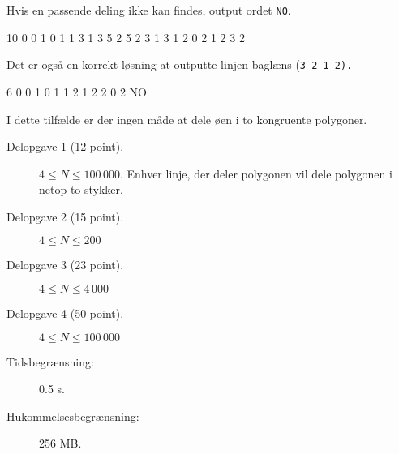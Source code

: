 \documentclass{boi2014-dk}
\newcommand{\constant}[1]{{\tt #1}}
\begin{document}
    Hvis en passende deling ikke kan findes, output ordet \constant{NO}.

    \Examples
	\example
	{
		10
		0 0
		1 0
		1 1
		3 1
		3 5
		2 5
		2 3
		1 3
		1 2
		0 2
	}
	{
		1 2 3 2
	}
	{
        Det er også en korrekt løsning at outputte linjen baglæns (\tt{3 2 1
        2}).

        \begin{center}
        \end{center}
	}

	\example
	{
		6
		0 0
		1 0
		1 1
		2 1
		2 2
		0 2
	}
	{
		NO
	}
    {
        I dette tilfælde er der ingen måde at dele øen i to kongruente
        polygoner.
        \begin{center}
        \end{center}
    }

    \Scoring

    \begin{description}
        \item[Delopgave 1 (12 point).] $4 \le N \le 100\,000$. Enhver linje,
            der deler polygonen vil dele polygonen i netop to stykker.
        \item[Delopgave 2 (15 point).] $4 \le N \le 200$
        \item[Delopgave 3 (23 point).] $4 \le N \le 4\,000$
        \item[Delopgave 4 (50 point).] $4 \le N \le 100\,000$
    \end{description}

    \Constraints

    \begin{description}
        \item[Tidsbegrænsning:] 0.5 s.
        \item[Hukommelsesbegrænsning:] 256 MB.
    \end{description}
\end{document}
